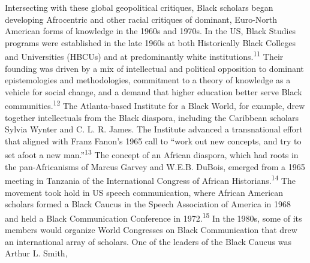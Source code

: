 \documentclass{tufte-handout}
\begin{document}
Intersecting with these global geopolitical critiques, Black scholars
began developing Afrocentric and other racial critiques of dominant,
Euro-North American forms of knowledge in the 1960s and 1970s. In the
US, Black Studies programs were established in the late 1960s at both
Historically Black Colleges and Universities (HBCUs) and at
predominantly white institutions.\textsuperscript{11} Their founding was driven by a mix of intellectual and
political opposition to dominant epistemologies and methodologies,
commitment to a theory of knowledge as a vehicle for social change, and
a demand that higher education better serve Black
communities.\textsuperscript{12} The Atlanta-based Institute for a
Black World, for example, drew together intellectuals from the Black
diaspora, including the Caribbean scholars Sylvia Wynter and C. L. R.
James. The Institute advanced a transnational effort that aligned with
Franz Fanon's 1965 call to ``work out new concepts, and try to set afoot
a new man.''\textsuperscript{13} The concept of
an African diaspora, which had roots in the pan-Africanisms of Marcus
Garvey and W.E.B. DuBois, emerged from a 1965 meeting in Tanzania of the
International Congress of African Historians.\textsuperscript{14} The movement took hold in US speech communication,
where African American scholars formed a Black Caucus in the Speech
Association of America in 1968 and held a Black Communication Conference
in 1972.\textsuperscript{15} In the 1980s, some of its members would organize World
Congresses on Black Communication that drew an international array of
scholars. One of the leaders of the Black Caucus was Arthur L. Smith,
\end{document}
